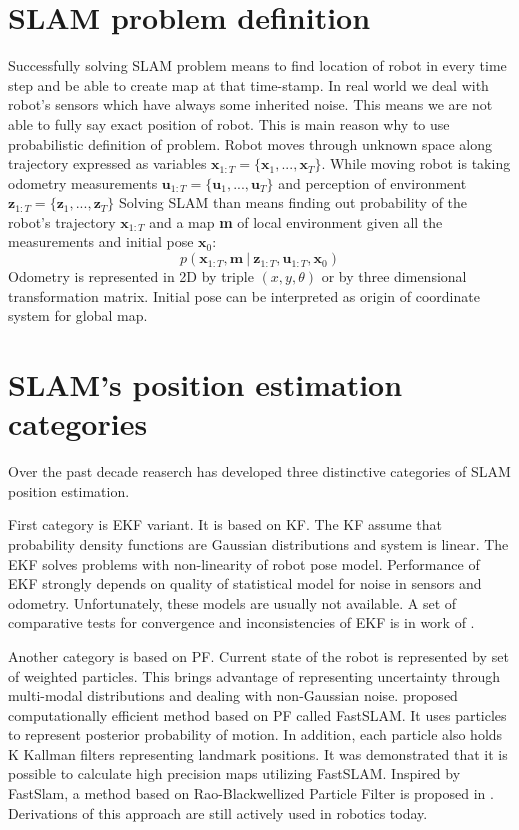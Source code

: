 \section{SLAM problem definition}
\label{sec:SLAM_def}
Successfully solving \gls{SLAM} problem means to find location of robot in every time step and be able to create map at that time-stamp. In real world we deal with robot's sensors which have always some inherited noise. This means we are not able to fully say exact position of robot. This is main reason why to use probabilistic definition of problem. Robot moves through unknown space along trajectory expressed as variables $ \textbf{x}_{1:T} = \{\textbf{x}_{1},...,\textbf{x}_{T}\} $. While moving robot is taking odometry measurements $ \textbf{u}_{1:T} = \{\textbf{u}_{1},...,\textbf{u}_{T}\}$ and perception of environment $ \textbf{z}_{1:T} = \{\textbf{z}_{1},...,\textbf{z}_{T}\}$ Solving SLAM than means finding out probability of the robot's trajectory $ \textbf{x}_{1:T}$ and a map \textbf{m} of local environment given all the measurements and initial pose $ \textbf{x}_{0}$:
\begin{equation}
p(\textbf{x}_{1:T}, \textbf{m}\: |\:  \textbf{z}_{1:T}, \textbf{u}_{1:T}, \textbf{x}_{0})
\end{equation}
Odometry is represented in 2D by triple $(x,y,\theta)$ or by three dimensional transformation matrix. Initial pose can be interpreted as origin of coordinate system for global map.

\section{SLAM's position estimation categories}
Over the past decade reaserch has developed three distinctive categories of \gls{SLAM} position estimation. 

First category is \gls{EKF} variant. It is based on \gls{KF}. The \gls{KF}  assume that probability density functions are Gaussian distributions and system is linear. The \gls{EKF} solves problems with non-linearity of robot pose model. Performance of \gls{EKF} strongly depends on quality of statistical model for noise in sensors and odometry. Unfortunately, these models are usually not available. A set of comparative tests for convergence and inconsistencies of \gls{EKF} is in work of \cite{EKF}.

Another category is based on \gls{PF}. Current state of the robot is represented by set of weighted particles. This brings advantage of representing uncertainty through multi-modal distributions and dealing with non-Gaussian noise. \cite{FastSlam} proposed computationally efficient method based on \gls{PF} called FastSLAM. It uses particles to represent posterior probability of motion. In addition, each particle also holds K Kallman filters representing landmark positions. It was demonstrated that it is possible to calculate high precision maps utilizing FastSLAM. Inspired by FastSlam, a method based on Rao-Blackwellized Particle Filter is proposed in \cite{Rao-PF}. Derivations of this approach are still actively used in robotics today. 

